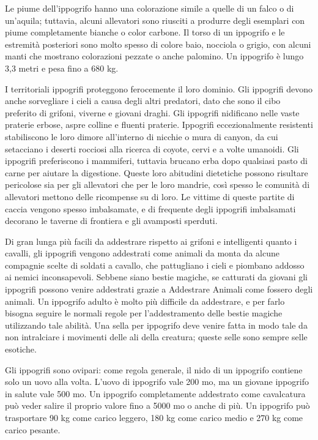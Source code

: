 \begin{multicols}{2}
	Le piume dell'ippogrifo hanno una colorazione simile a quelle di un falco o di un'aquila; tuttavia, alcuni allevatori sono riusciti a produrre degli esemplari con piume completamente bianche o color carbone. Il torso di un ippogrifo e le estremità posteriori sono molto spesso di colore baio, nocciola o grigio, con alcuni manti che mostrano colorazioni pezzate o anche palomino. Un ippogrifo è lungo 3,3 metri e pesa fino a 680 kg.

	I territoriali ippogrifi proteggono ferocemente il loro dominio. Gli ippogrifi devono anche sorvegliare i cieli a causa degli altri predatori, dato che sono il cibo preferito di grifoni, viverne e giovani draghi. Gli ippogrifi nidificano nelle vaste praterie erbose, aspre colline e fluenti praterie. Ippogrifi eccezionalmente resistenti stabiliscono le loro dimore all'interno di nicchie o mura di canyon, da cui setacciano i deserti rocciosi alla ricerca di coyote, cervi e a volte umanoidi. Gli ippogrifi preferiscono i mammiferi, tuttavia brucano erba dopo qualsiasi pasto di carne per aiutare la digestione. Queste loro abitudini dietetiche possono risultare pericolose sia per gli allevatori che per le loro mandrie, così spesso le comunità di allevatori mettono delle ricompense su di loro. Le vittime di queste partite di caccia vengono spesso imbalsamate, e di frequente degli ippogrifi imbalsamati decorano le taverne di frontiera e gli avamposti sperduti.

	Di gran lunga più facili da addestrare rispetto ai grifoni e intelligenti quanto i cavalli, gli ippogrifi vengono addestrati come animali da monta da alcune compagnie scelte di soldati a cavallo, che pattugliano i cieli e piombano addosso ai nemici inconsapevoli. Sebbene siano bestie magiche, se catturati da giovani gli ippogrifi possono venire addestrati grazie a Addestrare Animali come fossero degli animali. Un ippogrifo adulto è molto più difficile da addestrare, e per farlo bisogna seguire le normali regole per l'addestramento delle bestie magiche utilizzando tale abilità. Una sella per ippogrifo deve venire fatta in modo tale da non intralciare i movimenti delle ali della creatura; queste selle sono sempre selle esotiche.

	Gli ippogrifi sono ovipari: come regola generale, il nido di un ippogrifo contiene solo un uovo alla volta. L'uovo di ippogrifo vale 200 mo, ma un giovane ippogrifo in salute vale 500 mo. Un ippogrifo completamente addestrato come cavalcatura può veder salire il proprio valore fino a 5000 mo o anche di più. Un ippogrifo può trasportare 90 kg come carico leggero, 180 kg come carico medio e 270 kg come carico pesante.



\end{multicols}
